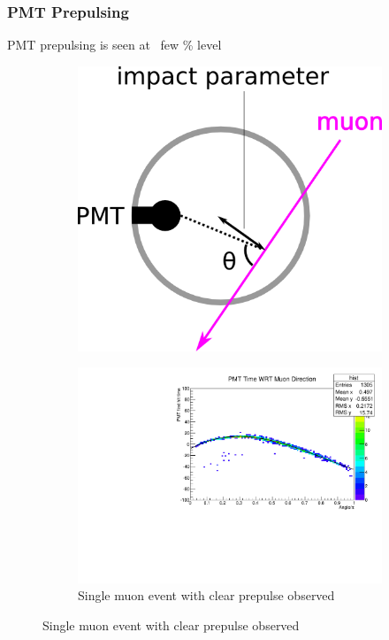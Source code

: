 \documentclass{beamer}
\begin{document}
\begin{frame}
	\frametitle{PMT Prepulsing}
	PMT prepulsing is seen at ~few \% level
	\begin{figure}
		\centering
		\begin{subfigure}[h]{0.45\textwidth}
			\includegraphics[width=\textwidth]{pmt_angle_wrt_muon}
		\end{subfigure}
		\begin{subfigure}[h]{0.45\textwidth}
			\includegraphics[width=\textwidth]{analyzed_rtq_run005000_hitTimePositions_0prepulseCutPassAt3SigOfNeighbors.pdf}
			\caption{Single muon event with clear prepulse observed}
		\end{subfigure}
	\end{figure}
\end{frame}
\end{document}
